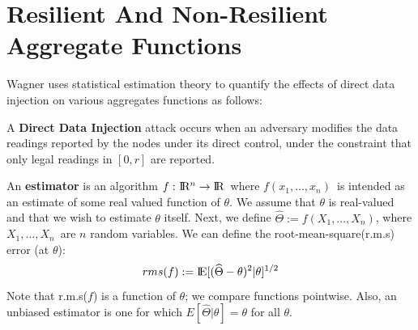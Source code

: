 \section{Resilient And Non-Resilient Aggregate Functions}
	
	Wagner \cite{wagner2004resilient} uses statistical estimation theory to quantify the effects of direct data injection on various aggregates functions as follows:

	\begin{definition}
		\label{def:direct-data-injection}
		\cite{chan2006secure} A \textbf{Direct Data Injection} attack occurs when an adversary modifies the data readings reported by the nodes under its direct control, under the constraint that only legal readings in $[0, r]$ are reported.
	\end{definition}
	An \textbf{estimator} is an algorithm $ f :\ \R^n \rightarrow \rm I\!R$\ where $f(x_{1},\dotsc, x_{n})$\ is intended as an estimate of some real valued function of $\theta$.
	We assume that $\theta$ is real-valued and that we wish to estimate $\theta$ itself.
	Next, we define $\widehat{\Theta} := f(X_{1},\dotsc,X_{n})$, where $X_{1},\dotsc,X_{n}$\ are $n$ random variables. We can define the root-mean-square(r.m.s)  error (at $\theta$):
	\begin{equation}
		rms(f) := \rm I\!E[(\widehat{\Theta} - \theta)^2 | \theta]^{1/2}
	\end{equation}
	Note that r.m.s($f$) is a function of $\theta$; we compare functions pointwise. 
	Also, an unbiased estimator is one for which $E[\widehat{\Theta} | \theta] = \theta $ for all $\theta$.


